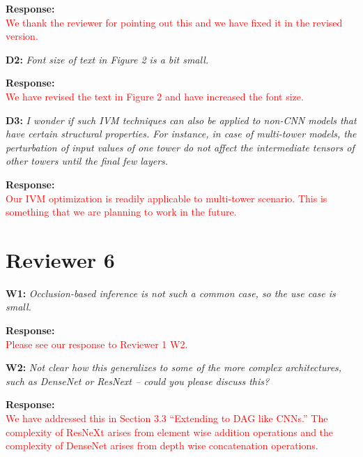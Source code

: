 \documentclass[preprint]{vldb}
\newcommand{\red}{\textcolor{red}}
\begin{document}
\vspace{2mm}
\noindent \textbf{Response:}\\
\red{We thank the reviewer for pointing out this and we have fixed it in the revised version.}

\vspace{2mm}
\noindent \textbf{D2:} \textit{ Font size of text in Figure 2 is a bit small.}

\vspace{2mm}
\noindent \textbf{Response:}\\
\red{We have revised the text in Figure 2 and have increased the font size.}

\vspace{2mm}
\noindent \textbf{D3:} \textit{I wonder if such IVM techniques can also be applied to non-CNN models that have certain structural properties. For instance, in case of multi-tower models, the perturbation of input values of one tower do not affect the intermediate tensors of other towers until the final few layers.}

\vspace{2mm}
\noindent \textbf{Response:}\\
\red{Our IVM optimization is readily applicable to multi-tower scenario. This is something that we are planning to work in the future.}

\section{Reviewer 6}

\vspace{2mm}
\noindent \textbf{W1:} \textit{Occlusion-based inference is not such a common case, so the use case is small.}

\vspace{2mm}
\noindent \textbf{Response:}\\
\red{Please see our response to Reviewer 1 W2.}

\vspace{2mm}
\noindent \textbf{W2:} \textit{Not clear how this generalizes to some of the more complex architectures, such as DenseNet or ResNext -- could you please discuss this?}

\vspace{2mm}
\noindent \textbf{Response:}\\
\red{We have addressed this in Section 3.3 “Extending to DAG like CNNs.” The complexity of ResNeXt arises from element wise addition operations and the complexity of DenseNet arises from depth wise concatenation operations.
}
\end{document}
